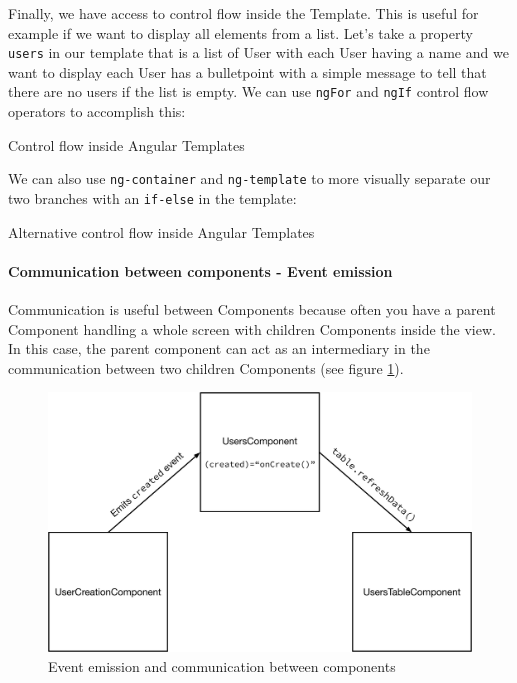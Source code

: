 \documentclass[twoside, openright,11pt,a4paper]{book}
\newenvironment{code}{\captionsetup{type=listing}}{}
\begin{document}
Finally, we have access to control flow inside the Template. This is useful for example if we want to display all elements from a list. Let's take a property \verb+users+ in our template that is a list of User with each User having a name and we want to display each User has a bulletpoint with a simple message to tell that there are no users if the list is empty. We can use \verb+ngFor+ and \verb+ngIf+ control flow operators to accomplish this:
\begin{code}
	\caption{Control flow inside Angular Templates}
\end{code}
We can also use \verb+ng-container+ and \verb+ng-template+ to more visually separate our two branches with an \verb+if-else+ in the template:
\begin{code}
	\caption{Alternative control flow inside Angular Templates}
\end{code}
\paragraph{Communication between components - Event emission}
\label{communication_components}
Communication is useful between Components because often you have a parent Component handling a whole screen with children Components inside the view. In this case, the parent component can act as an intermediary in the communication between two children Components (see figure \ref{communication_figure}). \\

\begin{figure}[H]
\begin{center}
	\includegraphics[width=.8\textwidth]{assets/componentsComm}
	\caption{Event emission and communication between components}
	\label{communication_figure}
\end{center}
\end{figure}
\end{document}
